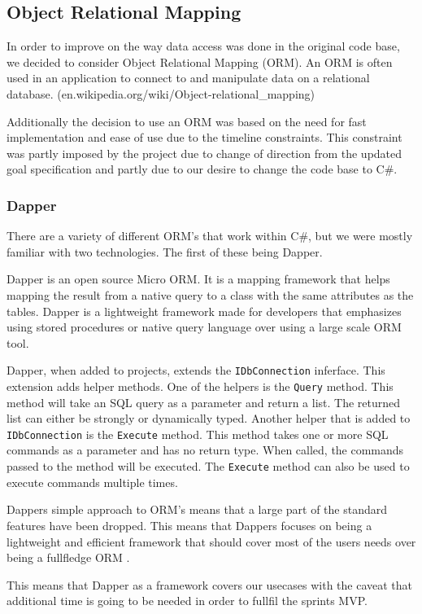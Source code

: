 \subsection{Object Relational Mapping}
In order to improve on the way data access was done in the original code base, we decided to consider Object Relational Mapping (ORM). An ORM is often used in an application to connect to and manipulate data on a relational database. (en.wikipedia.org/wiki/Object-relational_mapping)

Additionally the decision to use an ORM was based on the need for fast implementation and ease of use due to the timeline constraints. This constraint was partly imposed by the \knox{} project due to change of direction from the updated goal specification and partly due to our desire to change the code base to C#. 

\subsubsection{Dapper}
There are a variety of different ORM's that work within C#, but we were mostly familiar with two technologies. The first of these being Dapper.
 
Dapper is an open source Micro ORM. It is a mapping framework that helps mapping the result from a native query to a class with the same attributes as the tables. Dapper is a lightweight framework made for developers that emphasizes using stored procedures or native query language over using a large scale ORM tool. 


Dapper, when added to projects, extends the \texttt{IDbConnection} inferface. This extension adds helper methods. 
One of the helpers is the \texttt{Query} method. This method will take an SQL query as a parameter and return a list. The returned list can either be strongly or dynamically typed.
Another helper that is added to \texttt{IDbConnection} is the \texttt{Execute} method. This method takes one or more SQL commands as a parameter and has no return type. When called, the commands passed to the method will be executed. The \texttt{Execute} method can also be used to execute commands multiple times\cite{Dapper_Git}.

Dappers simple approach to ORM's means that a large part of the standard features have been dropped. This means that Dappers focuses on being a lightweight and efficient framework that should cover most of the users needs over being a fullfledge ORM \cite{Dapper_Git}.

This means that Dapper as a framework covers our usecases with the caveat that additional time is going to be needed in order to fullfil the sprints MVP. 

